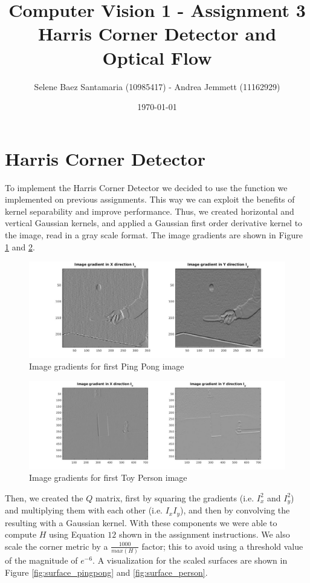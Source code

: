 \documentclass[11pt]{article}
\title{
	{Computer Vision 1 - Assignment 3 \\
	Harris Corner Detector and Optical Flow}
}
\author{
Selene Baez Santamaria (10985417) - Andrea Jemmett (11162929)}
\date{\today}
\begin{document}
\maketitle

\section{Harris Corner Detector}
To implement the Harris Corner Detector we decided to use the function we
implemented on previous assignments. This way we can exploit the benefits of
kernel separability and improve performance. Thus, we created horizontal and
vertical Gaussian kernels, and applied a Gaussian first order derivative kernel to the image, read in a gray scale format. The image gradients are shown in Figure
\ref{fig:partialDerivatives_pingpong} and \ref{fig:partialDerivatives_person}.

\begin{figure}[H] \centering
	\includegraphics[width=1\textwidth]{imgs/derivatives_pingpong.jpg}
	\caption{Image gradients for first Ping Pong image}
	\label{fig:partialDerivatives_pingpong}
\end{figure}

\begin{figure}[H] \centering
	\includegraphics[width=1\textwidth]{imgs/derivatives_person.jpg}
	\caption{Image gradients for first Toy Person image}
	\label{fig:partialDerivatives_person}
\end{figure}

Then, we created the $Q$ matrix, first by squaring the gradients (i.e.
$I_{x}^2$ and $I_{y}^2$) and multiplying them with each other (i.e. $I_x
I_y$), and then by convolving the resulting with a Gaussian kernel. With these
components we were able to compute $H$ using Equation $12$ shown in the
assignment instructions. We also scale the corner metric by a $\frac{1000}{
max(H)}$ factor; this to avoid using a threshold value of the magnitude of
$e^{-6}$. A visualization for the scaled surfaces are shown in
Figure \ref{fig:surface_pingpong} and \ref{fig:surface_person}.
\end{document}

